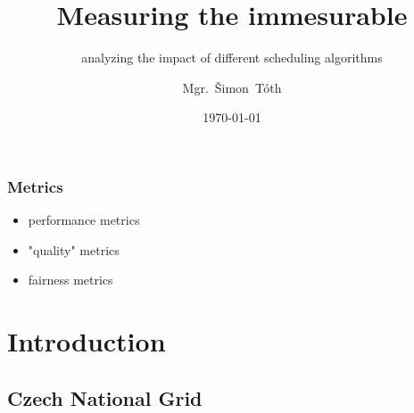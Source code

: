 

\title{Measuring the immesurable}
\subtitle{analyzing the impact of different scheduling algorithms}
\author[]{Mgr.~Šimon~Tóth}
\date{\today}



\begin{frame}
	\titlepage
\end{frame}

\begin{frame}
	\frametitle{Metrics}
	\begin{itemize}
		\item performance metrics
		\item "quality" metrics
		\item fairness metrics
	\end{itemize}
\end{frame}





\section{Introduction}
\subsection{Czech National Grid}

